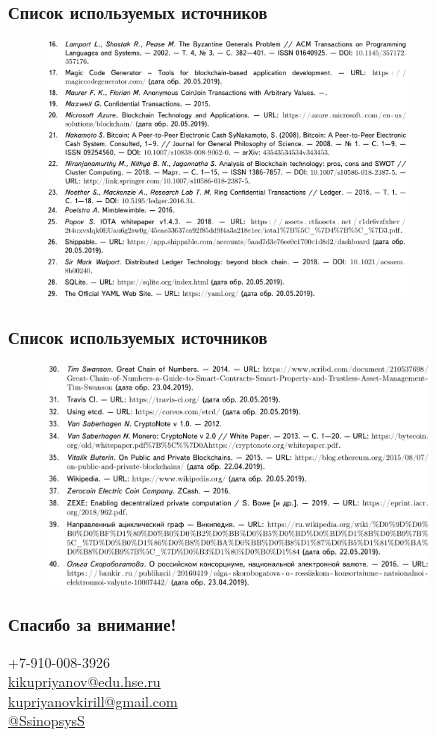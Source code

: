 \documentclass{beamer}
\begin{document}
\begin{frame}
    \frametitle{Список используемых источников}
    \begin{figure}
        \centering
        \includegraphics[width=0.85\textwidth]{lib2}
    \end{figure}
\end{frame}

\begin{frame}
    \frametitle{Список используемых источников}
    \begin{figure}
        \centering
        \includegraphics[width=0.9\textwidth]{lib3}
    \end{figure}
\end{frame}

\begin{frame}[c]
\begin{center}
\frametitle{\LARGE Спасибо за внимание!}

{\LARGE \inserttitle}

\bigskip

{\insertauthor}

\bigskip\bigskip

{\scriptsize \color{HSEblue}
    +7-910-008-3926\\
    \href{mailto:kikupriyanov@edu.hse.ru}{kikupriyanov@edu.hse.ru}\\
    \href{mailto:kupriyanovkirill@gmail.com}{kupriyanovkirill@gmail.com}\\
    \href{https://t.me/SsinopsysS}{@SsinopsysS}}

\bigskip\bigskip

{\large \insertdate}
\end{center}
\end{frame}
\end{document}
